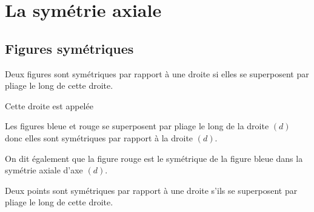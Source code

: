 \documentclass[a4paper,10pt]{report}
\begin{document}
\setcounter{chapter}{12}
\chapter{La symétrie axiale}

\section{Figures symétriques}

\begin{defn}
Deux figures sont symétriques par rapport à une droite si elles se superposent par pliage le long de cette droite. 

\medskip
\noindent Cette droite est appelée \dotfill
\end{defn}

\begin{ex}

\vspace{-3mm}
\noindent \begin{minipage}{8.5cm}
Les figures bleue et rouge se superposent par pliage le long de la droite $(d)$ donc elles sont symétriques par rapport à la droite $(d)$.

\medskip
\noindent On dit également que la figure rouge est le symétrique de la figure bleue dans la symétrie axiale d'axe $(d)$.

\medskip
\noindent Deux points sont symétriques par rapport à une droite s'ils se superposent par pliage le long de cette droite.


\end{minipage}
\end{ex}
\end{document}
